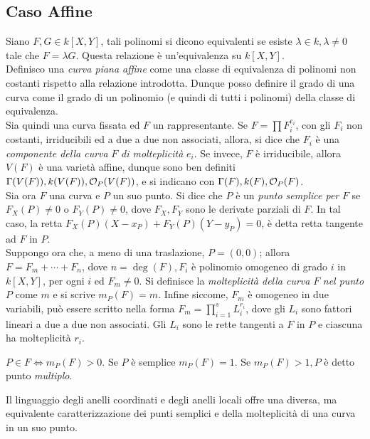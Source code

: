         \subsection{Caso Affine}
            Siano $F,G \in k[X,Y]$, tali polinomi si dicono equivalenti se esiste $\lambda \in k, \lambda \neq 0$ tale che $F = \lambda G$. Questa relazione è un'equivalenza su 
            $k[X,Y]$.\\
            Definisco una \emph{curva piana affine} come una classe di equivalenza di polinomi non costanti rispetto alla relazione introdotta. Dunque posso definire il grado di una curva come 
            il grado di un polinomio (e quindi di tutti i polinomi) della classe di equivalenza.\\
            Sia quindi una curva fissata ed $F$ un rappresentante. Se $F = \prod F_i^{e_i}$, con gli $F_i$ non costanti, irriducibili ed a due a due non associati, allora, si dice che 
            $F_i$ è una \emph{componente della curva} $F$ \emph{di molteplicità} $e_i$. Se invece, $F$ è irriducibile, allora $V(F)$ è una varietà affine, dunque sono ben definiti $\Gamma(V(F)),
            k(V(F)),\mathcal{O}_P(V(F))$, e si indicano con $\Gamma(F),k(F),\mathcal{O}_P(F)$.\\
            Sia ora $F$ una curva e $P$ un suo punto. Si dice che $P$ è un \emph{punto semplice per} $F$ se $F_X(P) \neq 0$ o $F_Y(P) \neq 0$, dove $F_X,F_Y$ sono le derivate parziali di $F$. 
            In tal caso, la retta $F_X(P)(X-x_P) + F_Y(P)(Y-y_P) = 0$, è detta retta tangente ad $F$ in $P$.\\
            Suppongo ora che, a meno di una traslazione, $P = (0,0)$; allora $F = F_m + \cdots + F_n$, dove $n = \deg(F), F_i$ è polinomio omogeneo di grado $i$ in $k[X,Y]$, per ogni $i$ ed 
            $F_m \neq 0$. Si definisce la \emph{molteplicità della curva} $F$ \emph{nel punto} $P$ come $m$ e si scrive $m_P(F) = m$. Infine siccome, $F_m$ è omogeneo in due variabili, può essere 
            scritto nella forma $F_m = \prod_{i=1}^s L_i^{r_i}$, dove gli $L_i$ sono fattori lineari a due a due non associati. Gli $L_i$ sono le rette tangenti a $F$ in $P$ e ciascuna ha molteplicità 
            $r_i$.
            \begin{osservazione}
                $P \in F \iff m_P(F) > 0$. Se $P$ è semplice $m_P(F) = 1$. Se $m_P(F) > 1, P$ è detto punto \emph{multiplo}. 
            \end{osservazione}
            \noindent
            Il linguaggio degli anelli coordinati e degli anelli locali offre una diversa, ma equivalente caratterizzazione dei punti semplici e della molteplicità di una curva in un suo punto. 
